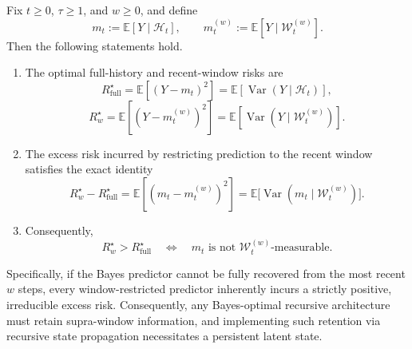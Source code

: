 \documentclass{llmxive}
\providecommand{\E}{\mathbb{E}}
\providecommand{\cH}{\mathcal{H}}
\providecommand{\cW}{\mathcal{W}}
\providecommand{\Var}{\operatorname{Var}}
\begin{document}
\begin{theorem}
\label{thm:necessity_persistent_state}
Fix $t\ge 0$, $\tau\ge 1$, and $w\ge 0$, and define
\begin{equation}
m_t := \E[Y\mid \cH_t],
\qquad
m_t^{(w)} := \E[Y\mid \cW_t^{(w)}].
\label{eq:m_and_mw_def}
\end{equation}
Then the following statements hold.
\begin{enumerate}
    \item[\textup{(i)}] The optimal full-history and recent-window risks are
    \begin{equation}
    R_{\mathrm{full}}^\star
    =
    \E[(Y-m_t)^2]
    =
    \E[\Var(Y\mid \cH_t)],
    \label{eq:Rfull_formula}
    \end{equation}
    \begin{equation}
    R_{w}^\star
    =
    \E[(Y-m_t^{(w)})^2]
    =
    \E[\Var(Y\mid \cW_t^{(w)})].
    \label{eq:Rw_formula}
    \end{equation}

    \item[\textup{(ii)}] The excess risk incurred by restricting prediction to the recent window satisfies the exact identity
    \begin{equation}
    R_{w}^\star - R_{\mathrm{full}}^\star
    =
    \E[(m_t-m_t^{(w)})^2]
    =
    \E\!\bigl[\Var(m_t\mid \cW_t^{(w)})\bigr].
    \label{eq:risk_gap_exact_identity}
    \end{equation}

    \item[\textup{(iii)}] Consequently,
    \begin{equation}
    R_{w}^\star > R_{\mathrm{full}}^\star
    \quad\Longleftrightarrow\quad
    m_t \text{ is not } \cW_t^{(w)}\text{-measurable}.
    \label{eq:iff_nonmeasurable}
    \end{equation}
\end{enumerate}
Specifically, if the Bayes predictor cannot be fully recovered from the most recent $w$ steps, every window-restricted predictor inherently incurs a strictly positive, irreducible excess risk. Consequently, any Bayes-optimal recursive architecture must retain supra-window information, and implementing such retention via recursive state propagation necessitates a persistent latent state.
\end{theorem}
\end{document}
